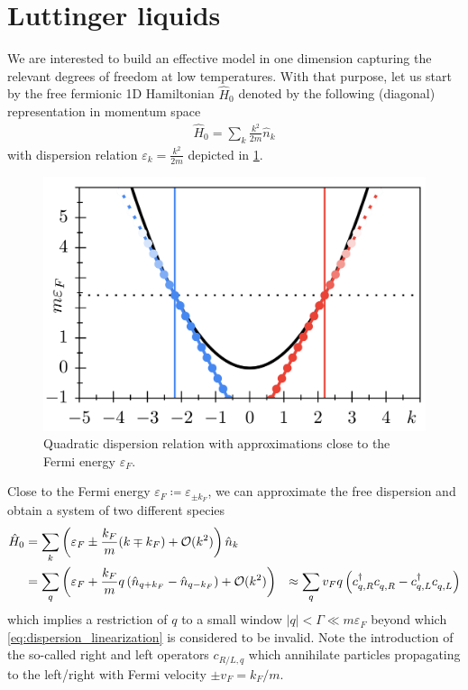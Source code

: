 \section{Luttinger liquids}
\label{sec:luttinger_liquids}
We are interested to build an effective model in one dimension capturing the relevant degrees of freedom at low temperatures.
With that purpose, let us start by the free fermionic 1D Hamiltonian $\hat H_0$ denoted by the following (diagonal) representation in momentum space
\begin{align}
    \hat H_0 = \sum_k \frac{k^2}{2m}\hat n_k
\end{align}
with dispersion relation $\varepsilon_k =\frac{k^2}{2m}$ depicted in \cref{fig:1D_quadratic_dispersion}.
\begin{figure}
    \centering
    \includegraphics{figures/1D_quadratic_dispersion.png}
    \caption{Quadratic dispersion relation with approximations close to the Fermi energy $\varepsilon_F$.}
    \label{fig:1D_quadratic_dispersion}
\end{figure}
Close to the Fermi energy $\varepsilon_F\coloneqq\varepsilon_{\pm k_F}$, we can approximate the free dispersion and obtain a system of two different species
\begin{align}
    \hat H_0
    &= \sum_k \brlr{\varepsilon_F \pm \frac{k_F}{m}(k\mp k_F) + \mathcal{O}(k^2)}\hat n_k
    \\
    &= \sum_q \brlr{\varepsilon_F + \frac{k_F}{m}q\brlr{\hat n_{q+k_F}-\hat n_{q-k_F}} + \mathcal{O}(k^2)}
    &\approx \sum_{q} v_Fq \brlr{c^\dag_{q,R}c^\pdag_{q,R} - c^\dag_{q,L}c^\pdag_{q,L}}
    \label{eq:dispersion_linearization}
\end{align}
which implies a restriction of $q$ to a small window $|q|<\Gamma\ll m\varepsilon_F$ beyond which \cref{eq:dispersion_linearization} is considered to be invalid.
Note the introduction of the so-called right and left operators $c_{R/L,q}$ which annihilate particles propagating to the left/right with Fermi velocity $\pm v_F=k_F/m$.
\\

